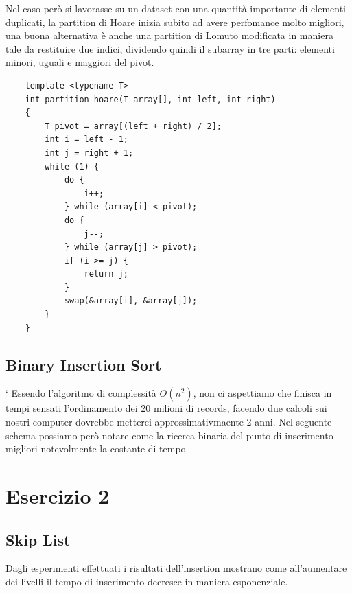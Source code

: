 \documentclass[12pt, letterpaper]{report}
\begin{document}
Nel caso però si lavorasse su un dataset con una quantità importante di elementi
duplicati, la partition di Hoare inizia subito ad avere perfomance molto migliori,
una buona alternativa è anche una partition di Lomuto modificata in maniera tale
da restituire due indici, dividendo quindi il subarray in tre parti:
elementi minori, uguali e maggiori del pivot.

\begin{lstlisting}
    template <typename T>
    int partition_hoare(T array[], int left, int right)
    {
        T pivot = array[(left + right) / 2];
        int i = left - 1;
        int j = right + 1;
        while (1) {
            do {
                i++;
            } while (array[i] < pivot);
            do {
                j--;
            } while (array[j] > pivot);
            if (i >= j) {
                return j;
            }
            swap(&array[i], &array[j]);
        }
    }
\end{lstlisting}

\newpage
\section{Binary Insertion Sort}`
Essendo l'algoritmo di complessità $O(n^2)$, non ci aspettiamo che finisca in tempi
sensati l'ordinamento dei 20 milioni di records, facendo due calcoli sui nostri computer
dovrebbe metterci approssimativmaente 2 anni.
Nel seguente schema possiamo però notare come la ricerca binaria del punto di inserimento
migliori notevolmente la costante di tempo.
\begin{figure}[H]
\centering
    
\end{figure}

\chapter*{Esercizio 2}

\section{Skip List}
Dagli esperimenti effettuati i risultati dell'insertion mostrano come 
all'aumentare dei livelli il tempo di inserimento decresce in maniera esponenziale.
\begin{figure}[H]
\centering
    
\end{figure}
\end{document}
